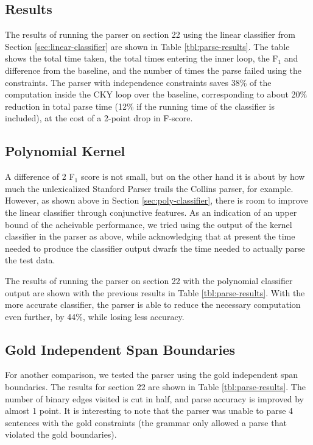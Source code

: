 \documentclass[11pt]{article}
\begin{document}
\subsection{Results}
\label{sec-5-2}
\label{sec:parse-results}

The results of running the parser on section 22 using the linear classifier from
Section \ref{sec:linear-classifier} are shown in Table
\ref{tbl:parse-results}. The table shows the total time taken, the total
times entering the inner loop, the F$_{\text{1}}$ and difference from the baseline, and the
number of times the parse failed using the constraints. The parser with
independence constraints saves 38\% of the computation inside the CKY loop over
the baseline, corresponding to about 20\% reduction in total parse time (12\% if
the running time of the classifier is included), at the cost of a 2-point drop
in F-score.

\subsection{Polynomial Kernel}
\label{sec-5-3}

A difference of 2 F$_{\text{1}}$ score is not small, but on the other hand it is
about by how much the unlexicalized Stanford Parser trails the Collins
parser, for example. However, as shown above in Section
\ref{sec:poly-classifier}, there is room to improve the linear
classifier through conjunctive features. As an indication of an upper
bound of the acheivable performance, we tried using the output of the
kernel classifier in the parser as above, while acknowledging that at
present the time needed to produce the classifier output dwarfs the
time needed to actually parse the test data.

The results of running the parser on section 22 with the polynomial classifier
output are shown with the previous results in Table \ref{tbl:parse-results}.
With the more accurate classifier, the parser is able to reduce the necessary
computation even further, by 44\%, while losing less accuracy. 

\subsection{Gold Independent Span Boundaries}
\label{sec-5-4}

For another comparison, we tested the parser using the gold independent span
boundaries. The results for section 22 are shown in Table
\ref{tbl:parse-results}. The number of binary edges visited is cut in half, and
parse accuracy is improved by almost 1 point. It is interesting to note that the
parser was unable to parse 4 sentences with the gold constraints (the grammar
only allowed a parse that violated the gold boundaries).
\end{document}
